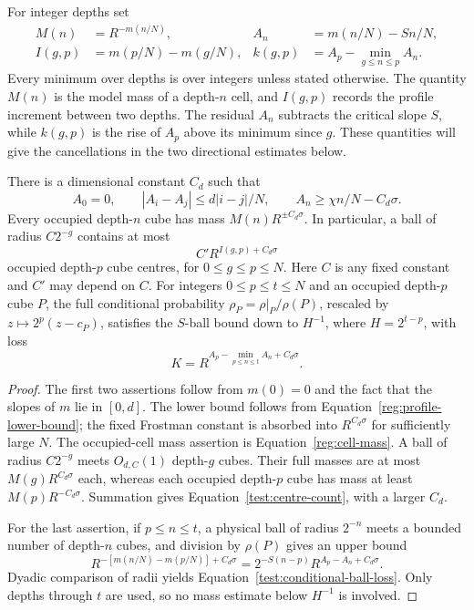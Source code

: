 For integer depths set
\begin{equation}\label{test:profile-definitions}
\begin{aligned}
M(n)&=R^{-m(n/N)},& A_n&=m(n/N)-Sn/N,\\
I(g,p)&=m(p/N)-m(g/N),&
k(g,p)&=A_p-\min_{g\le n\le p}A_n.
\end{aligned}
\end{equation}
Every minimum over depths is over integers unless stated otherwise.
The quantity $M(n)$ is the model mass of a depth-$n$ cell, and
$I(g,p)$ records the profile increment between two depths. The residual
$A_n$ subtracts the critical slope $S$, while $k(g,p)$ is the rise of
$A_p$ above its minimum since $g$. These quantities will give the
cancellations in the two directional estimates below.

\begin{lemma}\label{test:profile-bounds}
There is a dimensional constant $C_d$ such that
\[
A_0=0,\qquad |A_i-A_j|\le d|i-j|/N,\qquad
A_n\ge\chi n/N-C_d\sigma.
\]
Every occupied depth-$n$ cube has mass
$M(n)R^{\pm C_d\sigma}$.  In particular, a ball of radius
$C2^{-g}$ contains at most
\begin{equation}\label{test:centre-count}
C'R^{I(g,p)+C_d\sigma}
\end{equation}
occupied depth-$p$ cube centres, for $0\le g\le p\le N$.
Here $C$ is any fixed constant and $C'$ may depend on $C$.
For integers $0\le p\le t\le N$ and an occupied depth-$p$ cube $P$,
the full conditional probability $\rho_P=\rho|_P/\rho(P)$,
rescaled by $z\mapsto2^p(z-c_P)$, satisfies the $S$-ball bound down to
$H^{-1}$, where $H=2^{t-p}$, with loss
\begin{equation}\label{test:conditional-ball-loss}
K=R^{A_p-\min_{p\le n\le t}A_n+C_d\sigma}.
\end{equation}
\end{lemma}

\begin{proof}
The first two assertions follow from $m(0)=0$ and the fact that the
slopes of $m$ lie in $[0,d]$.  The lower bound follows from
Equation~\eqref{reg:profile-lower-bound}; the fixed Frostman constant
is absorbed into $R^{C_d\sigma}$ for sufficiently large $N$.
The occupied-cell mass assertion is
Equation~\eqref{reg:cell-mass}.  A ball of radius $C2^{-g}$ meets
$O_{d,C}(1)$ depth-$g$ cubes.  Their full masses are at most
$M(g)R^{C_d\sigma}$ each, whereas each occupied depth-$p$ cube has
mass at least $M(p)R^{-C_d\sigma}$.  Summation gives
Equation~\eqref{test:centre-count}, with a larger $C_d$.

For the last assertion, if $p\le n\le t$, a physical ball of radius
$2^{-n}$ meets a bounded number of depth-$n$ cubes, and division by
$\rho(P)$ gives an upper bound
\[
R^{-[m(n/N)-m(p/N)]+C_d\sigma}
=2^{-S(n-p)}R^{A_p-A_n+C_d\sigma}.
\]
Dyadic comparison of radii yields
Equation~\eqref{test:conditional-ball-loss}.  Only depths through $t$
are used, so no mass estimate below $H^{-1}$ is involved.
\end{proof}

